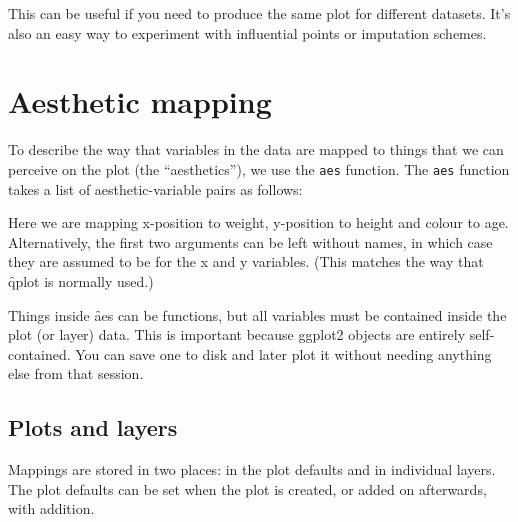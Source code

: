 % 


\noindent This can be useful if you need to produce the same plot for different datasets.  It's also an easy way to experiment with influential points or imputation schemes.


\section{Aesthetic mapping}
\label{sec:aes}

To describe the way that variables in the data are mapped to things that we can perceive on the plot (the ``aesthetics''), we use the {\tt aes} function.  The {\tt aes} function takes a list of aesthetic-variable pairs as follows:

% 


Here we are mapping x-position to weight, y-position to height and colour to age.  Alternatively, the first two arguments can be left without names, in which case they are assumed to be for the x and y variables.  (This matches the way that \f{qplot} is normally used.)

% 


Things inside \f{aes} can be functions, but all variables must be contained inside the plot (or layer) data.  This is important because ggplot2 objects are entirely self-contained.  You can save one to disk and later plot it without needing anything else from that session.

\subsection{Plots and layers}
\label{sub:plots_and_layers}

Mappings are stored in two places: in the plot defaults and in individual layers.  The plot defaults can be set when the plot is created, or added on afterwards, with addition.

% 


